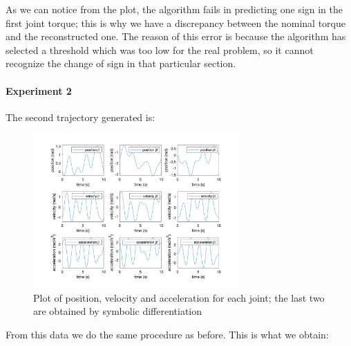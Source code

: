 \documentclass{article}
\begin{document}
As we can notice from the plot, the algorithm fails in predicting one sign in the first joint torque; this is why we have a discrepancy between the nominal torque and the reconstructed one. The reason of this error is because the algorithm has selected a threshold which was too low for the real problem, so it cannot recognize the change of sign in that particular section.

\paragraph{Experiment 2}
The second trajectory generated is:
\begin{figure}[!htbp]
\centering
\includegraphics[width=0.7\textwidth]{images/3-dof/trajectory456.png}
\caption{Plot of position, velocity and acceleration for each joint; the last two are obtained by symbolic differentiation}
\end{figure}
\FloatBarrier

From this data we do the same procedure as before. This is what we obtain:
\end{document}
